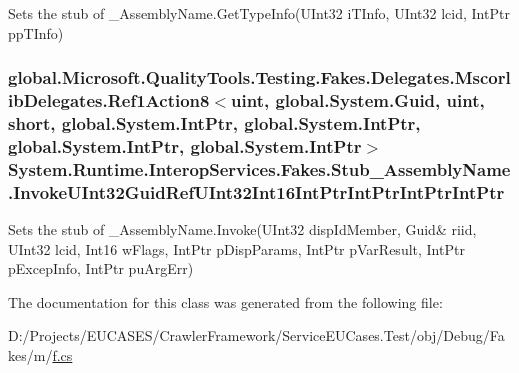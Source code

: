 Sets the stub of \-\_\-\-Assembly\-Name.\-Get\-Type\-Info(\-U\-Int32 i\-T\-Info, U\-Int32 lcid, Int\-Ptr pp\-T\-Info)

\hypertarget{class_system_1_1_runtime_1_1_interop_services_1_1_fakes_1_1_stub___assembly_name_a83019c55c39392ea2c6548af9c0de123}{
\subsubsection[{Invoke\-U\-Int32\-Guid\-Ref\-U\-Int32\-Int16\-Int\-Ptr\-Int\-Ptr\-Int\-Ptr\-Int\-Ptr}]{\setlength{\rightskip}{0pt plus 5cm}global.\-Microsoft.\-Quality\-Tools.\-Testing.\-Fakes.\-Delegates.\-Mscorlib\-Delegates.\-Ref1\-Action8$<$uint, global.\-System.\-Guid, uint, short, global.\-System.\-Int\-Ptr, global.\-System.\-Int\-Ptr, global.\-System.\-Int\-Ptr, global.\-System.\-Int\-Ptr$>$ System.\-Runtime.\-Interop\-Services.\-Fakes.\-Stub\-\_\-\-Assembly\-Name.\-Invoke\-U\-Int32\-Guid\-Ref\-U\-Int32\-Int16\-Int\-Ptr\-Int\-Ptr\-Int\-Ptr\-Int\-Ptr}}\label{class_system_1_1_runtime_1_1_interop_services_1_1_fakes_1_1_stub___assembly_name_a83019c55c39392ea2c6548af9c0de123}


Sets the stub of \-\_\-\-Assembly\-Name.\-Invoke(U\-Int32 disp\-Id\-Member, Guid\& riid, U\-Int32 lcid, Int16 w\-Flags, Int\-Ptr p\-Disp\-Params, Int\-Ptr p\-Var\-Result, Int\-Ptr p\-Excep\-Info, Int\-Ptr pu\-Arg\-Err)



The documentation for this class was generated from the following file\-:\begin{DoxyCompactItemize}
\item 
D\-:/\-Projects/\-E\-U\-C\-A\-S\-E\-S/\-Crawler\-Framework/\-Service\-E\-U\-Cases.\-Test/obj/\-Debug/\-Fakes/m/\hyperlink{m_2f_8cs}{f.\-cs}\end{DoxyCompactItemize}
